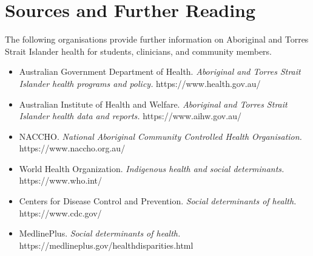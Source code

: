 \section*{Sources and Further Reading}
The following organisations provide further information on Aboriginal and Torres Strait Islander health for students, clinicians, and community members.

\begin{itemize}
    \item Australian Government Department of Health. \textit{Aboriginal and Torres Strait Islander health programs and policy.} https://www.health.gov.au/
    \item Australian Institute of Health and Welfare. \textit{Aboriginal and Torres Strait Islander health data and reports.} https://www.aihw.gov.au/
    \item NACCHO. \textit{National Aboriginal Community Controlled Health Organisation.} https://www.naccho.org.au/
    \item World Health Organization. \textit{Indigenous health and social determinants.} https://www.who.int/
    \item Centers for Disease Control and Prevention. \textit{Social determinants of health.} https://www.cdc.gov/
    \item MedlinePlus. \textit{Social determinants of health.} https://medlineplus.gov/healthdisparities.html
\end{itemize}

